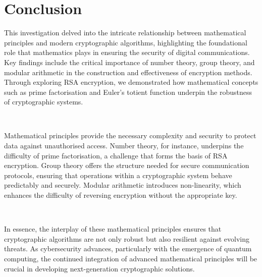 \documentclass[11pt]{article}
\begin{document}
\section{Conclusion}
This investigation delved into the intricate relationship between mathematical principles and modern cryptographic algorithms, highlighting the foundational role that mathematics plays in ensuring the security of digital communications. Key findings include the critical importance of number theory, group theory, and modular arithmetic in the construction and effectiveness of encryption methods. Through exploring RSA encryption, we demonstrated how mathematical concepts such as prime factorisation and Euler’s totient function underpin the robustness of cryptographic systems.

\

Mathematical principles provide the necessary complexity and security to protect data against unauthorised access. Number theory, for instance, underpins the difficulty of prime factorisation, a challenge that forms the basis of RSA encryption. Group theory offers the structure needed for secure communication protocols, ensuring that operations within a cryptographic system behave predictably and securely. Modular arithmetic introduces non-linearity, which enhances the difficulty of reversing encryption without the appropriate key.

\

In essence, the interplay of these mathematical principles ensures that cryptographic algorithms are not only robust but also resilient against evolving threats. As cybersecurity advances, particularly with the emergence of quantum computing, the continued integration of advanced mathematical principles will be crucial in developing next-generation cryptographic solutions.
\end{document}
